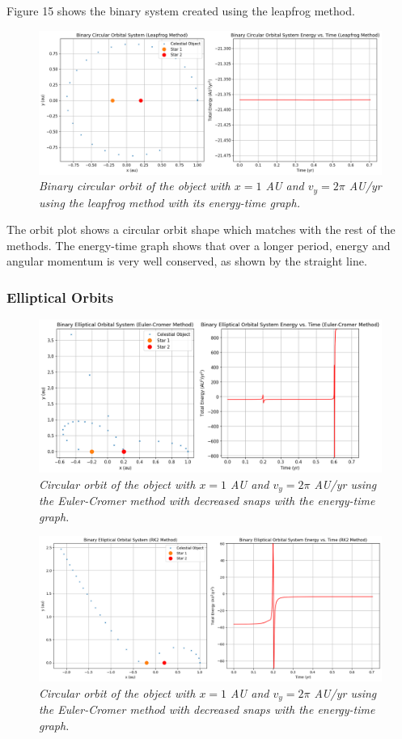 \documentclass[11 pt, a4paper]{article}
\begin{document}
Figure 15 shows the binary system created using the leapfrog method.
\begin{figure}[H]
  \includegraphics[width=1\linewidth]{binaryleapfrogcircular.png}
  \centering
  \caption{\textit{Binary circular orbit of the object with $x = 1$ AU and $v_y = 2\pi$ AU/yr using the leapfrog method with its energy-time graph.}} 
\end{figure}
The orbit plot shows a circular orbit shape which matches with the rest of the methods. The energy-time graph shows that over a longer period, energy and angular momentum is very well conserved, as shown by the straight line.

\subsubsection{Elliptical Orbits}
\begin{figure}[H]
  \includegraphics[width=0.7\linewidth]{binaryeulerelliptic.png}
  \centering
  \caption{\textit{Circular orbit of the object with $x = 1$ AU and $v_y = 2\pi$ AU/yr using the Euler-Cromer method with decreased snaps with the energy-time graph.}} 
\end{figure}

\begin{figure}[H]
  \includegraphics[width=0.7\linewidth]{binaryrk2elliptic.png}
  \centering
  \caption{\textit{Circular orbit of the object with $x = 1$ AU and $v_y = 2\pi$ AU/yr using the Euler-Cromer method with decreased snaps with the energy-time graph.}} 
\end{figure}
\end{document}
